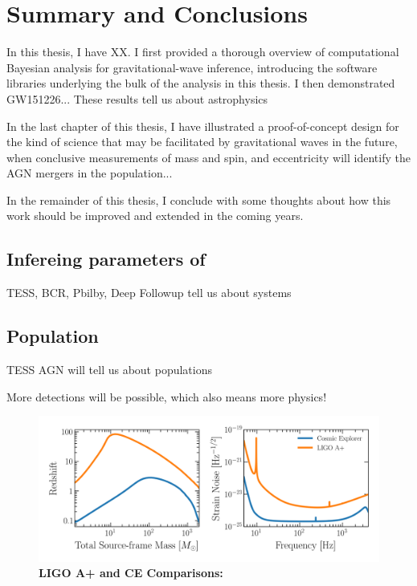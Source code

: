 \chapter{Summary and Conclusions}
\label{cp.conc}
In this thesis, I have XX.
I first provided a thorough overview of computational Bayesian analysis for gravitational-wave inference, introducing the software libraries underlying the bulk of the analysis in this thesis.
I then demonstrated GW151226...
These results tell us about astrophysics

In the last chapter of this thesis, I have illustrated a proof-of-concept design for the kind of science that may be facilitated by gravitational waves in the future, when conclusive measurements of mass and spin, and eccentricity will identify the AGN mergers in the population...

In the remainder of this thesis, I conclude with some thoughts about how this work should be improved and extended in the coming years.

\section{Infereing parameters of }

TESS, BCR, Pbilby, Deep Followup tell us about systems

\section{Population}
TESS AGN will tell us about populations


More detections will be possible, which also means more physics! 
\begin{figure}
\begin{center}
  \centerline{\includegraphics[width=1.\linewidth]{src/figures/ligo_vs_ce.png}}
  \caption{\textbf{LIGO A+ and CE Comparisons:}  }
  \label{fig:ligo_vs_ce}
\end{center}
\end{figure}



